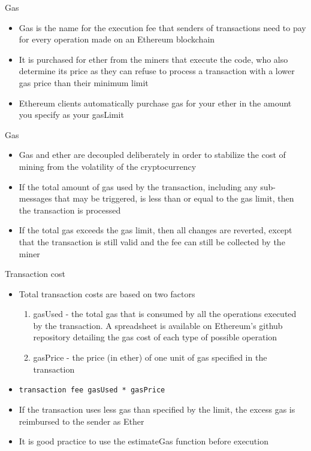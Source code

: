 \documentclass[9pt]{beamer}
\begin{document}


\begin{frame}{Gas}
	\begin{itemize}
		\item Gas is the name for the execution fee that senders of transactions need to pay for every operation made on an Ethereum blockchain
		\item It is purchased for ether from the miners that execute the code, who also determine its price as they can refuse to process a transaction with a lower gas price than their minimum limit
		\item Ethereum clients automatically purchase gas for your ether in the amount you specify as your gasLimit
	\end{itemize}
\end{frame}


\begin{frame}{Gas}
	\begin{itemize}
		\item Gas and ether are decoupled deliberately in order to stabilize the cost of mining from the volatility of the cryptocurrency
		\item If the total amount of gas used by the transaction, including any sub-messages that may be triggered, is less than or equal to the gas limit, then the transaction is processed
		\item If the total gas exceeds the gas limit, then all changes are reverted, except that the transaction is still valid and the fee can still be collected by the miner
	\end{itemize}
\end{frame}


\begin{frame}{Transaction cost}
	\begin{itemize}
		\item Total transaction costs are based on two factors
		\begin{enumerate}
			\item gasUsed - the total gas that is consumed by all the operations executed by the transaction. A spreadsheet is available on Ethereum's github repository detailing the gas cost of each type of possible operation
			\item gasPrice - the price (in ether) of one unit of gas specified in the transaction
		\end{enumerate}
		\item \texttt{transaction fee gasUsed * gasPrice}
		\item If the transaction uses less gas than specified by the limit, the excess gas is reimbursed to the sender as Ether
		\item It is good practice to use the estimateGas function before execution
	\end{itemize}
\end{frame}
\end{document}
